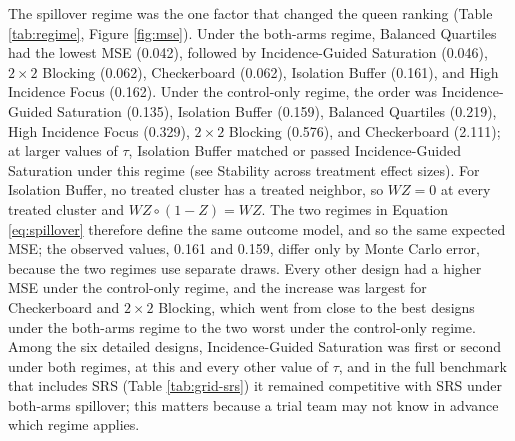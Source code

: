 \documentclass[11pt]{article}
\begin{document}
The spillover regime was the one factor that changed the queen ranking
(Table \ref{tab:regime}, Figure \ref{fig:mse}). Under the both-arms
regime, Balanced Quartiles had the lowest MSE (0.042), followed by
Incidence-Guided Saturation (0.046), \(2\times2\) Blocking
(0.062), Checkerboard (0.062), Isolation Buffer (0.161), and High
Incidence Focus (0.162). Under the control-only regime, the order was
Incidence-Guided Saturation (0.135), Isolation Buffer (0.159),
Balanced Quartiles (0.219), High Incidence Focus (0.329), \(2\times2\)
Blocking (0.576), and Checkerboard (2.111); at larger values of
\(\tau\), Isolation Buffer matched or passed Incidence-Guided Saturation under this regime (see Stability across treatment effect
sizes). For Isolation Buffer, no treated cluster has a treated neighbor,
so \(WZ = 0\) at every treated cluster and \(WZ \circ (1 - Z) = WZ\).
The two regimes in Equation \ref{eq:spillover} therefore define the same
outcome model, and so the same expected MSE; the observed values, 0.161
and 0.159, differ only by Monte Carlo error, because the two regimes use
separate draws. Every other design had a higher MSE under the
control-only regime, and the increase was largest for Checkerboard and
\(2\times2\) Blocking, which went from close to the best designs under
the both-arms regime to the two worst under the control-only regime.
Among the six detailed designs, Incidence-Guided Saturation was first or second under both regimes, at this and every other value of $\tau$, and in the full benchmark that includes SRS (Table \ref{tab:grid-srs}) it remained competitive with SRS under both-arms spillover; this matters because a trial team may not know in advance which regime applies.
\end{document}
